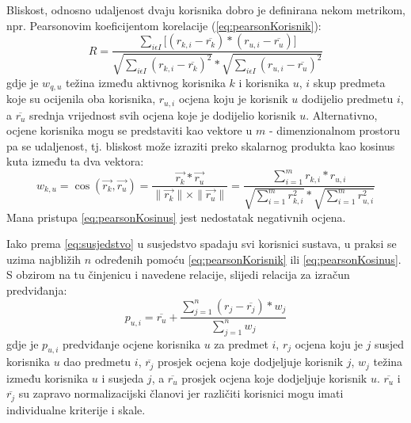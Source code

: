 \documentclass[times, utf8, diplomski, numeric]{fer}
\begin{document}
Bliskost, odnosno udaljenost dvaju korisnika dobro je definirana nekom metrikom,
npr. Pearsonovim koeficijentom korelacije (\ref{eq:pearsonKorisnik}):
\begin{equation}
\label{eq:pearsonKorisnik}
	R = \frac
			{\sum_{i \epsilon I} 
				\big[
					(r_{k,i} - \overline{r_k}) \ast
					(r_{u,i} - \overline{r_u})
				\big]
			}
			{
				\sqrt{{\sum_{i \epsilon I} (r_{k,i} - \overline{r_k})^2}} \ast 
				\sqrt{{\sum_{i \epsilon I} (r_{u,i} - \overline{r_u})^2}}
			}
\end{equation}
gdje je $w_{q,u}$ težina između aktivnog korisnika $k$ i korisnika $u$, $i$ skup
predmeta koje su ocijenila oba korisnika, $r_{u,i}$ ocjena koju je korisnik $u$
dodijelio predmetu $i$, a $\overline{r_u}$ srednja vrijednost svih ocjena koje
je dodijelio korisnik $u$.
Alternativno, ocjene korisnika mogu se predstaviti kao vektore u $m$ -
dimenzionalnom prostoru pa se udaljenost, tj. bliskost može izraziti preko
skalarnog produkta kao kosinus kuta između ta dva vektora:
\begin{equation}
\label{eq:pearsonKosinus}
	w_{k,u} = 
		\cos{(\vec{r_k}, \vec{r_u})} = 
		\frac
			{\vec{r_k} \ast \vec{r_u}}
			{\|\vec{r_k}\| \times \|\vec{r_u}\|} = 
		\frac
			{\sum_{i=1}^m r_{k,i} \ast r_{u,i}}
			{\sqrt{\sum_{i=1}^m r_{k,i}^2} \ast \sqrt{\sum_{i=1}^m r_{u,i}^2}}
\end{equation}
Mana pristupa \ref{eq:pearsonKosinus} jest nedostatak negativnih ocjena. 

Iako prema \ref{eq:susjedstvo} u susjedstvo spadaju svi korisnici sustava, u
praksi se uzima najbližih $n$ određenih pomoću \ref{eq:pearsonKorisnik} ili
\ref{eq:pearsonKosinus}. S obzirom na tu činjenicu i navedene relacije, slijedi
relacija za izračun predviđanja:
\begin{equation}
\label{eq:preduseruser}
	p_{u,i} =
		\overline{r_u}+
		\frac
			{\sum_{j = 1}^n (r_{j} - \overline{r_j}) \ast w_j}
			{\sum_{j = 1}^n w_j}
\end{equation}
gdje je $p_{u,i}$ predviđanje ocjene korisnika $u$ za predmet $i$, $r_j$ ocjena
koju je $j$ susjed korisnika $u$ dao predmetu $i$, $\overline{r_j}$ prosjek
ocjena koje dodjeljuje korisnik $j$, $w_j$ težina između korisnika $u$ i susjeda
$j$, a $\overline{r_u}$ prosjek ocjena koje dodjeljuje korisnik $u$.
$\overline{r_u}$ i $\overline{r_j}$ su zapravo normalizacijski članovi jer
različiti korisnici mogu imati individualne kriterije i skale. 
\end{document}
